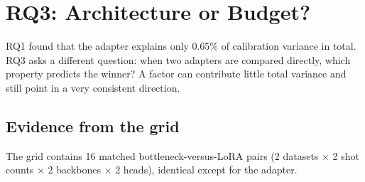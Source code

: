 \section{RQ3: Architecture or Budget?}
\label{sec:rq3}

RQ1 found that the adapter explains only 0.65\% of calibration variance in total. RQ3 asks a different
question: when two adapters are compared directly, which property predicts the winner? A factor can
contribute little total variance and still point in a very consistent direction.

\subsection{Evidence from the grid}

The grid contains 16 matched bottleneck-versus-LoRA pairs (2 datasets $\times$ 2 shot counts $\times$ 2
backbones $\times$ 2 heads), identical except for the adapter.

